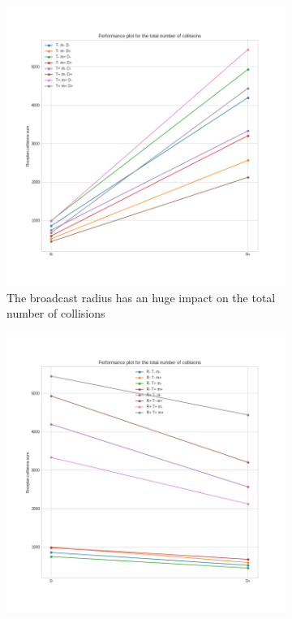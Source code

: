 \begin{figure}[htb]
	\centering
	\begin{subfigure}[b]{0.38\textwidth}
		\centering
		\includegraphics[width=\textwidth]{img/hd/collisions-R-perfplot}
		\caption{The broadcast radius has an huge impact on the total
		number of collisions}\label{subfig:hdperfcollisionsR}
	\end{subfigure}
	\begin{subfigure}[b]{0.38\textwidth}
		\centering
		\includegraphics[width=\textwidth]{img/hd/collisions-D-perfplot}

\end{subfigure}
\end{figure}
